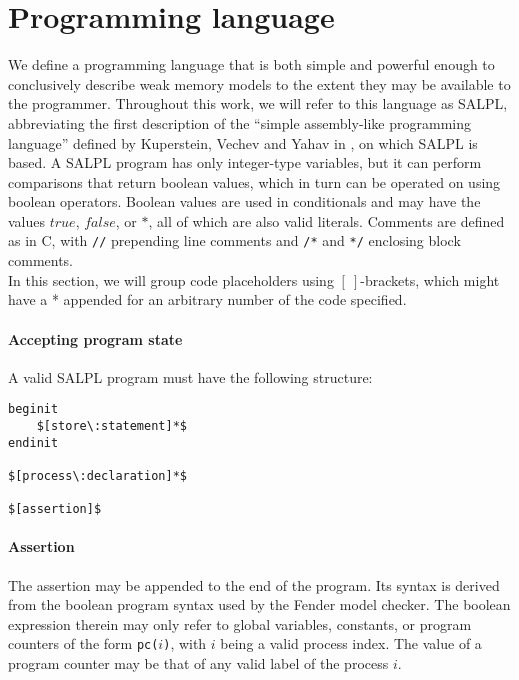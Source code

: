\section{Programming language}

We define a programming language that is both simple and powerful enough to conclusively describe weak memory models to the extent they may be available to the programmer. Throughout this work, we will refer to this language as SALPL, abbreviating the first description of the ``simple assembly-like programming language'' \cite{kupersteinetal10} defined by Kuperstein, Vechev and Yahav in \cite{kupersteinetal10}, on which SALPL is based. A SALPL program has only integer-type variables, but it can perform comparisons that return boolean values, which in turn can be operated on using boolean operators. Boolean values are used in conditionals and may have the values $true$, $false$, or $*$, all of which are also valid literals. Comments are defined as in C, with \lstinline{//} prepending line comments and \lstinline{/*} and \lstinline{*/} enclosing block comments.\\

In this section, we will group code placeholders using $[\:]$-brackets, which might have a * appended for an arbitrary number of the code specified.

\paragraph{Accepting program state}

A valid SALPL program must have the following structure:

\begin{lstlisting}[frame=single, mathescape]
beginit
	$[store\:statement]*$
endinit

$[process\:declaration]*$

$[assertion]$
\end{lstlisting}

\paragraph{Assertion}

The assertion may be appended to the end of the program. Its syntax is derived from the boolean program syntax used by the Fender \cite{fender} model checker. The boolean expression therein may only refer to global variables, constants, or program counters of the form \lstinline$pc($$i$\lstinline$)$, with $i$ being a valid process index. The value of a program counter may be that of any valid label of the process $i$.

